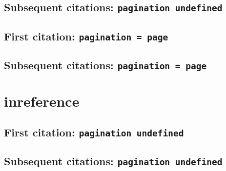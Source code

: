 \documentclass[a4paper]{article}
\begin{document}
\cite{dahn+liefeld:see+vision+eye}

\citereset
\cite[577]{dahn+liefeld:see+vision+eye}

\citereset
\cite[note]{dahn+liefeld:see+vision+eye}

\subsection{Subsequent citations: \texttt{pagination undefined}}

\cite{dahn+liefeld:see+vision+eye}

\cite[577]{dahn+liefeld:see+vision+eye}

\cite[note]{dahn+liefeld:see+vision+eye}

\subsection{First citation: \texttt{pagination = page}}

\cite{dahn+liefeld:see+vision+eye:a}

\citereset
\cite[577]{dahn+liefeld:see+vision+eye:a}

\citereset
\cite[note]{dahn+liefeld:see+vision+eye:a}

\subsection{Subsequent citations: \texttt{pagination = page}}

\cite{dahn+liefeld:see+vision+eye:a}

\cite[577]{dahn+liefeld:see+vision+eye:a}

\cite[note]{dahn+liefeld:see+vision+eye:a}

\section{inreference}

\subsection{First citation: \texttt{pagination undefined}}

\cite{olson:2003}

\citereset
\cite[577]{olson:2003}

\citereset
\cite[note]{olson:2003}

\subsection{Subsequent citations: \texttt{pagination undefined}}
\end{document}
